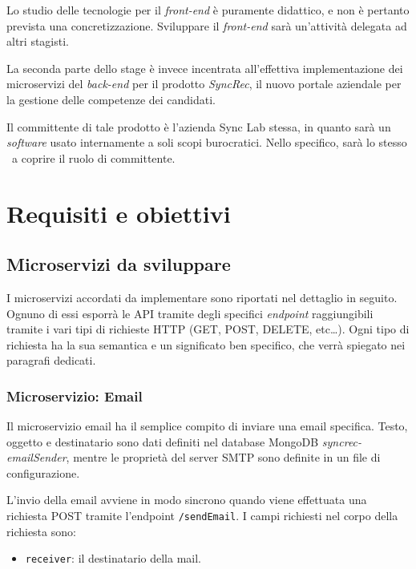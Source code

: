 Lo studio delle tecnologie per il \textit{front-end} è puramente didattico, e non è pertanto prevista una concretizzazione.
Sviluppare il \textit{front-end} sarà un'attività delegata ad altri stagisti.

La seconda parte dello stage è invece incentrata all'effettiva implementazione dei microservizi del \textit{back-end} per il prodotto \textit{SyncRec}, il nuovo portale aziendale per la gestione delle competenze dei candidati.

Il committente di tale prodotto è l'azienda Sync Lab stessa, in quanto sarà un \textit{software} usato internamente a soli scopi burocratici.
Nello specifico, sarà lo stesso \fabio\ a coprire il ruolo di committente.

\section{Requisiti e obiettivi}

\subsection{Microservizi da sviluppare}

I microservizi accordati da implementare sono riportati nel dettaglio in seguito. Ognuno di essi esporrà le API tramite degli specifici \textit{endpoint}
raggiungibili tramite i vari tipi di richieste HTTP (GET, POST, DELETE, etc\dots).
Ogni tipo di richiesta ha la sua semantica e un significato ben specifico, che verrà spiegato nei paragrafi dedicati.

\subsubsection{Microservizio: Email}

Il microservizio email ha il semplice compito di inviare una email specifica.
Testo, oggetto e destinatario sono dati definiti nel database MongoDB
\textit{syncrec-emailSender}, mentre le proprietà del server SMTP sono definite in un file di configurazione.

L'invio della email avviene in modo sincrono quando viene effettuata una richiesta POST tramite l'endpoint \texttt{/sendEmail}.
I campi richiesti nel corpo della richiesta sono:
\begin{itemize}
	\item \texttt{receiver}: il destinatario della mail.
\end{itemize}

